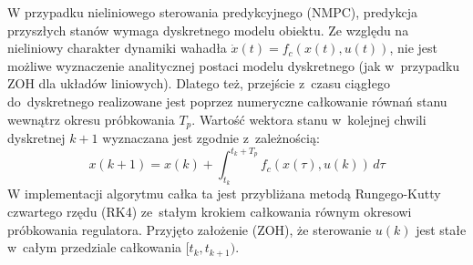 W przypadku nieliniowego sterowania predykcyjnego (NMPC), predykcja przyszłych stanów wymaga dyskretnego modelu obiektu. Ze względu na nieliniowy charakter dynamiki wahadła $\dot{x}(t) = f_c(x(t), u(t))$, nie jest możliwe wyznaczenie analitycznej postaci modelu dyskretnego (jak w~przypadku ZOH dla układów liniowych). Dlatego też, przejście z~czasu ciągłego do~dyskretnego realizowane jest poprzez numeryczne całkowanie równań stanu wewnątrz okresu próbkowania $T_p$. Wartość wektora stanu w~kolejnej chwili dyskretnej $k+1$ wyznaczana jest zgodnie z~zależnością:
\begin{equation}
x(k+1) = x(k) + \int_{t_k}^{t_k + T_p} f_c(x(\tau), u(k)) \, d\tau
\end{equation}
W implementacji algorytmu całka ta jest przybliżana metodą Rungego-Kutty czwartego rzędu (RK4) ze~stałym krokiem całkowania równym okresowi próbkowania regulatora. Przyjęto założenie (ZOH), że sterowanie $u(k)$ jest stałe w~całym przedziale całkowania $[t_k, t_{k+1})$.

